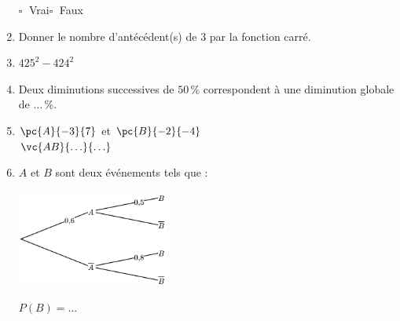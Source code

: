 \documentclass[a4paper,11pt,landscape,exos]{nsi} %
\begin{document}
\begin{multicols}{2}
\begin{enumerate}[itemsep=1em]
    	$\square\;$ Vrai\qquad $\square\;$ Faux\qquad 
	\item Donner le nombre d'antécédent(s) de $3$ par la fonction carré. 
	\item $425^2-424^2$ 
	\item Deux diminutions successives de  $50\,\%$ correspondent à une diminution globale de  $\ldots \,\%$.
	\item $\pc{A}{-3}{7}$ et $\pc{B}{-2}{-4}$\\[.5em]
         $\vc{AB}{\ldots}{\ldots}$
	\item $A$ et $B$ sont deux événements tels que :
    \begin{center}
        \includegraphics[width=5cm]{Interro4_arbre.png}
    \end{center}$P(B)=\ldots$ 

\end{enumerate}


\vfill\null
\end{multicols}

\newpage
\end{document}
